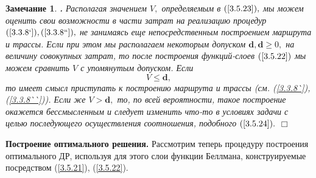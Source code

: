 \documentclass[11pt,twoside,openany]{report}
\newcommand{\bfn}{\begin{equation}}
\newcommand{\efn}{\end{equation}}
\newcounter{theo}
\newcounter{zam}
\newtheorem{zam}{Замечание}[section]
\newcommand{\TL}{\mbox{\bf{$\!\!$.}}}
\begin{document}
{\begin{zam}\label{z3.5.1}{\TL} Располагая значением $V,$ определяемым в $(\ref{3.5.23}),$
мы можем оценить свои возможности в части затрат на реализацию процедур $(\ref{3.3.8`}),
(\ref{3.3.8``}),$ не занимаясь еще непосредственным построением маршрута и трассы. Если при
этом мы располагаем некоторым допуском $\mathbf{d}, \mathbf{d}\geqslant 0,$ на величину
совокупных затрат, то после построения функций-слоев $(\ref{3.5.22})$ мы можем сравнить $V$
с упомянутым допуском. Если
\bfn\label{3.5.24}V \leqslant \mathbf{d},
\efn
то имеет смысл приступать к построению маршрута и трассы (см. (\ref{3.3.8`}),
(\ref{3.3.8``})). Если же $V > \mathbf{d},$ то, по всей вероятности, такое построение
окажется бессмысленным и следует изменить что-то в условиях задачи с целью последующего
осуществления соотношения, подобного $(\ref{3.5.24}).$
\hfill $\Box$ \end{zam}

{\bf Построение оптимального решения.} Рассмотрим теперь процедуру построения оптимального
ДР, используя для этого слои функции Беллмана, конструируемые посредством (\ref{3.5.21}),
(\ref{3.5.22}).

}
\end{document}

